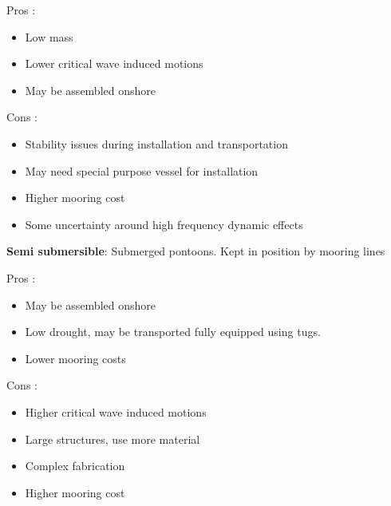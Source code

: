\begin{varwidth}[t]{.5\textwidth}
Pros :
\begin{itemize}
\item Low mass
\item Lower critical wave induced motions
\item May be assembled onshore
\end{itemize}
\end{varwidth}%
\hspace{4em}%
\begin{varwidth}[t]{.5\textwidth}
Cons :
\begin{itemize}
\item Stability issues during installation and transportation
\item May need special purpose vessel for installation
\item Higher mooring cost
\item Some uncertainty around high frequency dynamic effects
\end{itemize}
\end{varwidth}
\newline
\newline

\noindent \textbf{Semi submersible}: Submerged pontoons. Kept in position by mooring lines

\begin{varwidth}[t]{.5\textwidth}
Pros :
\begin{itemize}
\item May be assembled onshore
\item Low drought, may be transported fully equipped using tugs.
\item Lower mooring costs 
\end{itemize}
\end{varwidth}%
\hspace{4em}%
\begin{varwidth}[t]{.5\textwidth}
Cons :
\begin{itemize}
\item Higher critical wave induced motions
\item Large structures, use more material
\item Complex fabrication
\item Higher mooring cost
\end{itemize}
\end{varwidth}
\newline 

